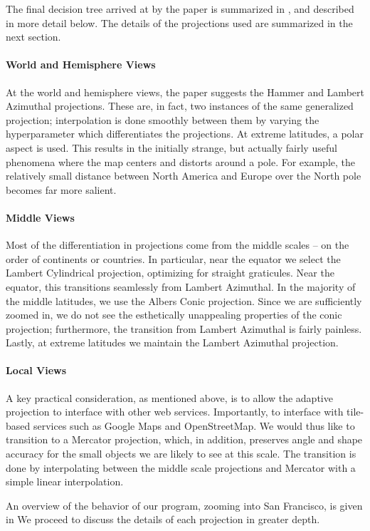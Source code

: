 The final decision tree arrived at by the paper is summarized in
  , and described in more detail below.
The details of the projections used are summarized in the next section.

\paragraph{World and Hemisphere Views}
At the world and hemisphere views, the paper suggests the Hammer and Lambert
  Azimuthal projections.
These are, in fact, two instances of the same generalized projection;
  interpolation is done smoothly between them by varying the hyperparameter
  which differentiates the projections.
At extreme latitudes, a polar aspect is used.
This results in the initially strange, but actually fairly useful phenomena
  where the map centers and distorts around a pole.
For example, the relatively small distance between North America and Europe
  over the North pole becomes far more salient.

\paragraph{Middle Views}
Most of the differentiation in projections come from the middle scales -- on the
  order of continents or countries.
In particular, near the equator we select the Lambert Cylindrical projection,
  optimizing for straight graticules.
Near the equator, this transitions seamlessly from Lambert Azimuthal.
In the majority of the middle latitudes, we use the Albers Conic projection.
Since we are sufficiently zoomed in, we do not see the esthetically unappealing
  properties of the conic projection; furthermore, the transition from
  Lambert Azimuthal is fairly painless.
Lastly, at extreme latitudes we maintain the Lambert Azimuthal projection.

\paragraph{Local Views}
A key practical consideration, as mentioned above, is to allow the adaptive
  projection to interface with other web services.
Importantly, to interface with tile-based services such as Google Maps and
  OpenStreetMap.
We would thus like to transition to a Mercator projection, which, in addition,
  preserves angle and shape accuracy for the small objects we are likely to
  see at this scale.
The transition is done by interpolating between the middle scale projections
  and Mercator with a simple linear interpolation.

An overview of the behavior of our program, zooming into San Francisco, is
  given in 
We proceed to discuss the details of each projection in greater depth.
